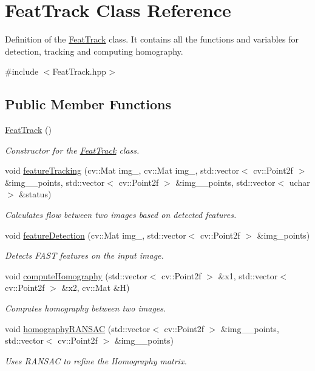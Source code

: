 \hypertarget{class_feat_track}{}\section{Feat\+Track Class Reference}
\label{class_feat_track}


Definition of the \hyperlink{class_feat_track}{Feat\+Track} class. It contains all the functions and variables for detection, tracking and computing homography.  




{\ttfamily \#include $<$Feat\+Track.\+hpp$>$}

\subsection*{Public Member Functions}
\begin{DoxyCompactItemize}
\item 
\hyperlink{class_feat_track_a1155bdc5bde9a95519354144f9920beb}{Feat\+Track} ()
\begin{DoxyCompactList}\small\item\em Constructor for the \hyperlink{class_feat_track}{Feat\+Track} class. \end{DoxyCompactList}\item 
void \hyperlink{class_feat_track_ab1dd27505ee431ded0b68a32d959410b}{feature\+Tracking} (cv\+::\+Mat img\+\_, cv\+::\+Mat img\+\_, std\+::vector$<$ cv\+::\+Point2f $>$ \&img\+\_\+\_\+points, std\+::vector$<$ cv\+::\+Point2f $>$ \&img\+\_\+\_\+points, std\+::vector$<$ uchar $>$ \&status)
\begin{DoxyCompactList}\small\item\em Calculates flow between two images based on detected features. \end{DoxyCompactList}\item 
void \hyperlink{class_feat_track_ae0c07b941c44dd1bf32d866611561835}{feature\+Detection} (cv\+::\+Mat img\+\_, std\+::vector$<$ cv\+::\+Point2f $>$ \&img\+\_\+points)
\begin{DoxyCompactList}\small\item\em Detects F\+A\+ST features on the input image. \end{DoxyCompactList}\item 
void \hyperlink{class_feat_track_a46b14a758dd70d9a6e7a70f0cdfaa347}{compute\+Homography} (std\+::vector$<$ cv\+::\+Point2f $>$ \&x1, std\+::vector$<$ cv\+::\+Point2f $>$ \&x2, cv\+::\+Mat \&H)
\begin{DoxyCompactList}\small\item\em Computes homography between two images. \end{DoxyCompactList}\item 
void \hyperlink{class_feat_track_abb6e503ee7c4eaed6c00d386d797f35a}{homography\+R\+A\+N\+S\+AC} (std\+::vector$<$ cv\+::\+Point2f $>$ \&img\+\_\+\_\+points, std\+::vector$<$ cv\+::\+Point2f $>$ \&img\+\_\+\_\+points)
\begin{DoxyCompactList}\small\item\em Uses R\+A\+N\+S\+AC to refine the Homography matrix. \end{DoxyCompactList}\end{DoxyCompactItemize}


